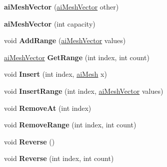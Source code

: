 \begin{DoxyCompactItemize}
\item 
\hypertarget{classai_mesh_vector_ac9241f5c28c7f4990410529c5fece989}{{\bfseries ai\+Mesh\+Vector} (\hyperlink{classai_mesh_vector}{ai\+Mesh\+Vector} other)}\label{classai_mesh_vector_ac9241f5c28c7f4990410529c5fece989}

\item 
\hypertarget{classai_mesh_vector_a516cd95bbaf0cc7a75243e58d6ce2754}{{\bfseries ai\+Mesh\+Vector} (int capacity)}\label{classai_mesh_vector_a516cd95bbaf0cc7a75243e58d6ce2754}

\item 
\hypertarget{classai_mesh_vector_aa70bbbffdb90f81ff6ca52cd8ee67c0c}{void {\bfseries Add\+Range} (\hyperlink{classai_mesh_vector}{ai\+Mesh\+Vector} values)}\label{classai_mesh_vector_aa70bbbffdb90f81ff6ca52cd8ee67c0c}

\item 
\hypertarget{classai_mesh_vector_a3adbded1eb3104360bca56aa2e3d46ce}{\hyperlink{classai_mesh_vector}{ai\+Mesh\+Vector} {\bfseries Get\+Range} (int index, int count)}\label{classai_mesh_vector_a3adbded1eb3104360bca56aa2e3d46ce}

\item 
\hypertarget{classai_mesh_vector_ac4eeb2f4a0792943fb51b7413a93e85a}{void {\bfseries Insert} (int index, \hyperlink{structai_mesh}{ai\+Mesh} x)}\label{classai_mesh_vector_ac4eeb2f4a0792943fb51b7413a93e85a}

\item 
\hypertarget{classai_mesh_vector_a4f8efe37ae7e3e81f1ffe4c7cd09f1e6}{void {\bfseries Insert\+Range} (int index, \hyperlink{classai_mesh_vector}{ai\+Mesh\+Vector} values)}\label{classai_mesh_vector_a4f8efe37ae7e3e81f1ffe4c7cd09f1e6}

\item 
\hypertarget{classai_mesh_vector_a7b9332143e6a295f20a98003b6257a2e}{void {\bfseries Remove\+At} (int index)}\label{classai_mesh_vector_a7b9332143e6a295f20a98003b6257a2e}

\item 
\hypertarget{classai_mesh_vector_af5b6dd78e30a53dd784be8ab65e10a71}{void {\bfseries Remove\+Range} (int index, int count)}\label{classai_mesh_vector_af5b6dd78e30a53dd784be8ab65e10a71}

\item 
\hypertarget{classai_mesh_vector_af91f487e335fbe55c70f0ffc81f641ef}{void {\bfseries Reverse} ()}\label{classai_mesh_vector_af91f487e335fbe55c70f0ffc81f641ef}

\item 
\hypertarget{classai_mesh_vector_a58cf7106e666ad2bce70d3adc26267de}{void {\bfseries Reverse} (int index, int count)}\label{classai_mesh_vector_a58cf7106e666ad2bce70d3adc26267de}


\end{DoxyCompactItemize}
